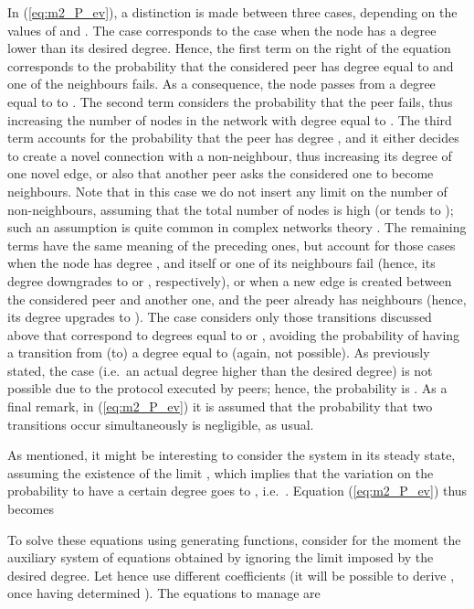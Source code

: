 \documentclass[a4paper,twosided]{article}
\begin{document}
In (\ref{eq:m2_P_ev}), a distinction is made between three cases, depending on the values of  and . 
The case  corresponds to the case when the node has a degree lower than its desired degree. Hence,
the first term on the right of the equation corresponds to the probability that the considered peer has degree equal to  and one of the  neighbours fails. As a consequence, the node passes from a degree equal to  to . The second term considers the probability that the peer fails, thus increasing the number of nodes in the network with degree equal to . The third term accounts for the probability that the peer has degree , and it either decides to create a novel connection with a non-neighbour, thus increasing its degree of one novel edge, or also that another peer asks the considered one to become neighbours. Note that in this case we do not insert any limit on the number of non-neighbours, assuming that the total number of nodes is high (or tends to ); such an  assumption is quite common in complex networks theory \cite{Newman03thestructure}. The remaining terms have the same meaning of the preceding ones, but account for those cases when the node has degree , and itself or one of its  neighbours fail (hence, its degree downgrades to  or , respectively), or when a new edge is created between the considered peer and another one, and the peer already has  neighbours (hence, its degree upgrades to ).  
The case  considers only those transitions discussed above that correspond to degrees equal to  or , avoiding the probability of having a transition from (to) a degree equal to  (again, not possible). 
As previously stated, the case  (i.e.~an actual degree higher than the desired degree) is not possible due to the protocol executed by peers; hence, the probability is . As a final remark, in (\ref{eq:m2_P_ev}) it is assumed that the probability that two transitions occur simultaneously is negligible, as usual.

As mentioned, it might be interesting to consider the system in its steady state, assuming the existence of the limit , which implies that the variation on the probability to have a certain degree goes to , i.e.~. 
Equation (\ref{eq:m2_P_ev}) thus becomes


To solve these equations using generating functions, consider for the moment the auxiliary system of equations obtained by ignoring the limit imposed by the desired degree. Let hence use different coefficients  (it will be possible to derive , once having determined ). The equations to manage are
\end{document}
